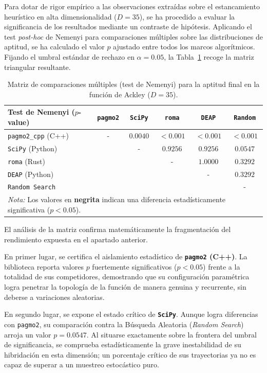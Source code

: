 \documentclass[12pt,a4paper,twoside,openright]{book}
\begin{document}
    Para dotar de rigor empírico a las observaciones extraídas sobre el estancamiento heurístico en alta dimensionalidad ($D=35$), se ha procedido a evaluar la significancia de los resultados mediante un contraste de hipótesis. Aplicando el test \textit{post-hoc} de Nemenyi para comparaciones múltiples sobre las distribuciones de aptitud, se ha calculado el valor $p$ ajustado entre todos los marcos algorítmicos. Fijando el umbral estándar de rechazo en $\alpha = 0.05$, la Tabla~\ref{tab:nemenyi_ackley_35} recoge la matriz triangular resultante.

\begin{table}[htbp]
\centering
\small
\setlength{\tabcolsep}{4pt}
\begin{tabular}{l cccc c}
\toprule
\textbf{Test de Nemenyi ($p$-value)} & \texttt{pagmo2} & \texttt{SciPy} & \texttt{roma} & \texttt{DEAP} & \texttt{Random} \\
\midrule
\texttt{pagmo2\_cpp} (C++)    & - & $\mathbf{0.0040}$ & $\mathbf{< 0.001}$ & $\mathbf{< 0.001}$ & $\mathbf{< 0.001}$ \\
\texttt{SciPy} (Python)       & & - & $0.9256$ & $0.9256$ & $0.0547$ \\
\texttt{roma} (Rust)         & & & - & $1.0000$ & $0.3292$ \\
\texttt{DEAP} (Python)        & & & & - & $0.3292$ \\
\texttt{Random Search}        & & & & & - \\
\bottomrule
\multicolumn{6}{l}{\scriptsize \textit{Nota:} Los valores en \textbf{negrita} indican una diferencia estadísticamente significativa ($p < 0.05$).}
\end{tabular}
\caption{Matriz de comparaciones múltiples (test de Nemenyi) para la aptitud final en la función de Ackley ($D=35$).}
\label{tab:nemenyi_ackley_35}
\end{table}

    El análisis de la matriz confirma matemáticamente la fragmentación del rendimiento expuesta en el apartado anterior.

    En primer lugar, se certifica el aislamiento estadístico de \textbf{\texttt{pagmo2} (C++)}. La biblioteca reporta valores $p$ fuertemente significativos ($p < 0.05$) frente a la totalidad de sus competidores, demostrando que su configuración paramétrica logra penetrar la topología de la función de manera genuina y recurrente, sin deberse a variaciones aleatorias.

    En segundo lugar, se expone el estado crítico de \textbf{\texttt{SciPy}}. Aunque logra diferencias con \texttt{pagmo2}, su comparación contra la Búsqueda Aleatoria (\textit{Random Search}) arroja un valor $p = 0.0547$. Al situarse exactamente sobre la frontera del umbral de significancia, se comprueba estadísticamente la grave inestabilidad de su hibridación en esta dimensión; un porcentaje crítico de sus trayectorias ya no es capaz de superar a un muestreo estocástico puro.
\end{document}
